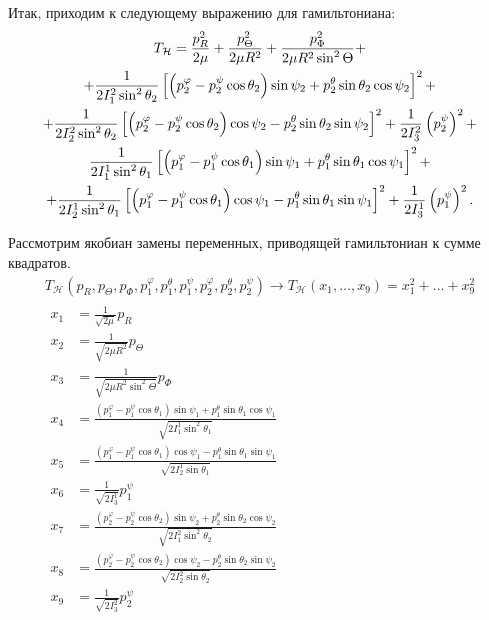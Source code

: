 \documentclass[14pt]{extarticle}
\newcommand{\If}{I_1^2}
\newcommand{\Is}{I_2^2}
\newcommand{\It}{I_3^2}
\newcommand{\Iff}{I_1^1}
\newcommand{\Iss}{I_2^1}
\newcommand{\Itt}{I_3^1}
\newcommand{\lb}{\left(}
\newcommand{\rb}{\right)}
\newcommand{\lsq}{\left[}
\newcommand{\rsq}{\right]}
\newcommand{\mH}{\mathcal{H}}
\begin{document}
Итак, приходим к следующему выражению для гамильтониана:
\begin{gather}
	T_\mathcal{H} = \frac{p_R^2}{2 \mu} + \frac{p_\Theta^2}{2 \mu R^2} + \frac{p_\Phi^2}{2 \mu R^2 \sin^2 \Theta} + \notag \\
	+ \frac{1}{2 \If \sin^2 \theta_2} \lsq \lb p_2^\varphi - p_2^\psi \cos \theta_2 \rb \sin \psi_2 + p_2^\theta \sin \theta_2 \cos \psi_2 \rsq^2 + \notag \\
	+\frac{1}{2 \Is \sin^2 \theta_2} \lsq \lb p_2^\varphi - p_2^\psi \cos \theta_2 \rb \cos \psi_2 - p_2^\theta \sin \theta_2 \sin \psi_2 \rsq^2 + \frac{1}{2 \It} \lb p_2^\psi \rb^2 + \notag \\
	\frac{1}{2 \Iff \sin^2 \theta_1} \lsq \lb p_1^\varphi - p_1^\psi \cos \theta_1 \rb \sin \psi_1 + p_1^\theta \sin \theta_1 \cos \psi_1 \rsq^2 + \notag \\
	+\frac{1}{2 \Iss \sin^2 \theta_1} \lsq \lb p_1^\varphi - p_1^\psi \cos \theta_1 \rb \cos \psi_1 - p_1^\theta \sin \theta_1 \sin \psi_1 \rsq^2 + \frac{1}{2 \Itt} \lb p_1^\psi \rb^2.
\end{gather}

Рассмотрим якобиан замены переменных, приводящей гамильтониан к сумме квадратов. 
\begin{gather}
	T_\mH(p_R, p_\Theta, p_\Phi, p_1^\varphi, p_1^\theta, p_1^\psi, p_2^\varphi, p_2^\theta, p_2^\psi) \longrightarrow T_\mH(x_1, \dots, x_9) = x_1^2 + \dots + x_9^2 \\
	\begin{aligned}
		x_1 &= \frac{1}{\sqrt{2 \mu}} p_R \\
		x_2 &= \frac{1}{\sqrt{2 \mu R^2}} p_\Theta \\
		x_3 &= \frac{1}{\sqrt{2 \mu R^2 \sin^2 \Theta}} p_\Phi \\
		x_4 &= \frac{(p_1^\varphi - p_1^\psi \cos \theta_1) \sin \psi_1 + p_1^\theta \sin \theta_1 \cos \psi_1}{\sqrt{2 I_1^1 \sin^2 \theta_1}} \\
		x_5 &= \frac{(p_1^\varphi - p_1^\psi \cos \theta_1) \cos \psi_1 - p_1^\theta \sin \theta_1 \sin \psi_1}{\sqrt{2 I_2^1 \sin \theta_1}} \\
		x_6 &= \frac{1}{\sqrt{2 I_3^1}} p_1^\psi \\
		x_7 &= \frac{(p_2^\varphi - p_2^\psi \cos \theta_2) \sin \psi_2 + p_2^\theta \sin \theta_2 \cos \psi_2}{\sqrt{2 I_1^2 \sin^2 \theta_2}} \\
		x_8 &= \frac{(p_2^\varphi - p_2^\psi \cos \theta_2) \cos \psi_2 - p_2^\theta \sin \theta_2 \sin \psi_2}{\sqrt{2 I_2^2 \sin \theta_2}} \\
		x_9 &= \frac{1}{\sqrt{2 I_3^2}} p_2^\psi
	\end{aligned} 
\end{gather}
\end{document}
